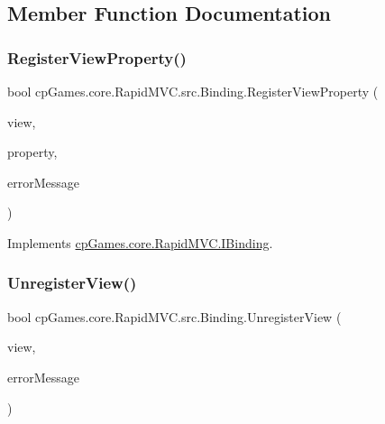 \subsection{Member Function Documentation}
\mbox{\label{classcp_games_1_1core_1_1_rapid_m_v_c_1_1src_1_1_binding_aebd156eee7ea9bd0aea09c36b3a32a95}} 
\subsubsection{\texorpdfstring{RegisterViewProperty()}{RegisterViewProperty()}}
{\footnotesize\ttfamily bool cp\+Games.\+core.\+Rapid\+M\+V\+C.\+src.\+Binding.\+Register\+View\+Property (\begin{DoxyParamCaption}\item[{\mbox{\hyperlink{interfacecp_games_1_1core_1_1_rapid_m_v_c_1_1_i_view}{I\+View}}}]{view,  }\item[{Property\+Info}]{property,  }\item[{out string}]{error\+Message }\end{DoxyParamCaption})}



Implements \mbox{\hyperlink{interfacecp_games_1_1core_1_1_rapid_m_v_c_1_1_i_binding_a600504a6b8ba86a81e02ef03c4dc9e53}{cp\+Games.\+core.\+Rapid\+M\+V\+C.\+I\+Binding}}.

\mbox{\label{classcp_games_1_1core_1_1_rapid_m_v_c_1_1src_1_1_binding_a09b069af4432f3652799483a7dd41fee}} 
\subsubsection{\texorpdfstring{UnregisterView()}{UnregisterView()}}
{\footnotesize\ttfamily bool cp\+Games.\+core.\+Rapid\+M\+V\+C.\+src.\+Binding.\+Unregister\+View (\begin{DoxyParamCaption}\item[{\mbox{\hyperlink{interfacecp_games_1_1core_1_1_rapid_m_v_c_1_1_i_view}{I\+View}}}]{view,  }\item[{out string}]{error\+Message }\end{DoxyParamCaption})}



